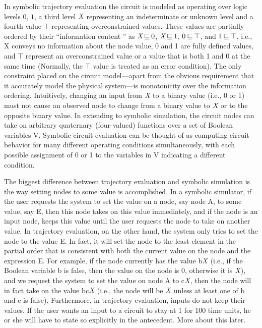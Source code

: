 In symbolic trajectory evaluation the circuit is modeled as operating
over logic levels%
%
{} $0$, $1$, a third level $\mbox{\em X}$ representing an indeterminate%
%
{}
or unknown%
%
{} level and a fourth value $\top$ representing overconstrained%
%
{}
values. These values are partially ordered%
%
{} by their ``information content%
%
{}'' as $\mbox{\em X} \mbox{$\: \sqsubseteq \:$} 0$, $\mbox{\em X} \mbox{$\: \sqsubseteq \:$} 1$, $0\mbox{$\: \sqsubseteq \:$} \top$, and
$1\mbox{$\: \sqsubseteq \:$} \top$, i.e., X conveys no information about the node value, 0 and
1 are fully defined values,
and $\top$ represent an overconstrained value or a value that is both
1 and 0 at the same time (Normally, the $\top$ value is treated as an
error condition). The only constraint placed on the circuit
model---apart from the obvious requirement that it accurately model
the physical system---is monotonicity%
%
{} over the information ordering.
Intuitively, changing an input from $\mbox{\em X}$ to a binary value (i.e., 0
or 1) must not cause an observed node to change from a binary value
to $\mbox{\em X}$ or to the opposite binary value.  In extending to symbolic
simulation, the circuit nodes can take on arbitrary quaternary
(four-valued)  functions over a set of Boolean variables V. Symbolic
circuit evaluation can be thought of as computing circuit behavior
for many different operating conditions simultaneously, with each
possible assignment of 0 or 1 to the variables in V indicating a
different condition.

The biggest difference between trajectory evaluation and symbolic
simulation is the way setting nodes%
%
{} to some value is accomplished.
In a symbolic simulator, if the user requests the system to set
the value on a node, say node A, to some value, say E, then this
node takes on this value immediately, and if the node is an input
node, keeps this value until the user requests the node to take on
another value. In trajectory evaluation, on the other hand, the
system only tries to set the node to the value E. In fact, it will
set the node to the least element in the partial order that is
consistent with both the current value on the node and the expression
E. For example, if the node currently has the value b$\mbox{\em X}$ (i.e., if
the Boolean variable b is false, then the value on the node is 0,
otherwise it is $\mbox{\em X}$), and we request the system to set the value on
node A to  c$\mbox{\em X}$, then the node will in fact take on the value bc$\mbox{\em X}$
(i.e., the node will be $\mbox{\em X}$ unless at least one of b and c is false).
Furthermore, in trajectory evaluation, inputs do not keep their values. If the
user wants an input to a circuit to stay at 1 for 100 time units,
he or she will have to state so explicitly in the antecedent. More
about this later.

